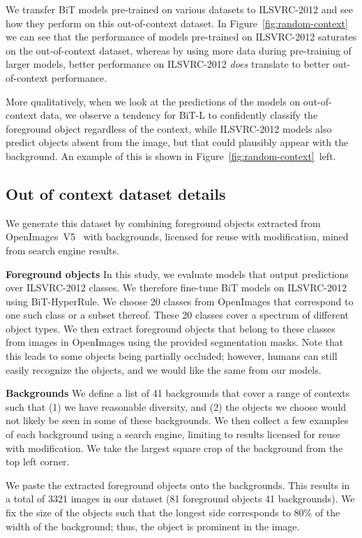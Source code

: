 \documentclass[runningheads]{llncs}
\newcommand{\name}{{BiT}}
\newcommand{\hyper}{{BiT-HyperRule}}
\newcommand{\imagenet}{{ILSVRC-2012}}
\begin{document}
We transfer \name{} models pre-trained on various datasets to \imagenet{} and see how they perform on this out-of-context dataset.
In Figure~\ref{fig:random-context} we can see that the performance of models pre-trained on \imagenet{} saturates on the out-of-context dataset, whereas by using more data during pre-training of larger models, better performance on \imagenet{} \emph{does} translate to better out-of-context performance.

More qualitatively, when we look at the predictions of the models on out-of-context data, we observe a tendency for \name{}-L to confidently classify the foreground object regardless of the context,
while \imagenet{} models also predict objects absent from the image, but that could plausibly appear with the background.
An example of this is shown in Figure~\ref{fig:random-context}~left.

\subsection{Out of context dataset details}
\label{out-of-context-dataset-details}
We generate this dataset by combining foreground objects extracted from OpenImages~V5~\cite{OpenImages} with backgrounds, licensed for reuse with modification, mined from search engine results. 

\textbf{Foreground objects} 
In this study, we evaluate models that output predictions over \imagenet{} classes.
We therefore fine-tune BiT models on \imagenet{} using \hyper{}.
We choose 20 classes from OpenImages that correspond to one such class or a subset thereof. These 20 classes cover a spectrum of different object types. We then extract foreground objects that belong to these classes from images in OpenImages using the provided segmentation masks.
Note that this leads to some objects being partially occluded; however, humans can still easily recognize the objects, and we would like the same from our models.

\textbf{Backgrounds} We define a list of 41 backgrounds that cover a range of contexts such that (1) we have reasonable diversity, and (2) the objects we choose would not likely be seen in some of these backgrounds. We then collect a few examples of each background using a search engine, limiting to results licensed for reuse with modification. We take the largest square crop of the background from the top left corner.

We paste the extracted foreground objects onto the backgrounds. This results in a total of 3321 images in our dataset (81 foreground objects  41 backgrounds). We fix the size of the objects such that the longest side corresponds to 80\% of the width of the background; thus, the object is prominent in the image.
\end{document}
